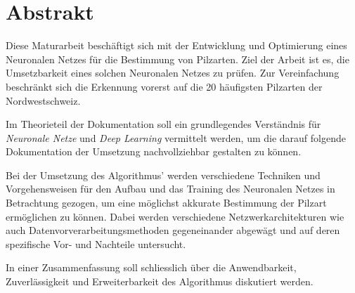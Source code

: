 \section*{Abstrakt}
Diese Maturarbeit beschäftigt sich mit der Entwicklung und Optimierung eines Neuronalen Netzes für die Bestimmung von Pilzarten. Ziel der Arbeit ist es, die Umsetzbarkeit eines solchen Neuronalen Netzes zu prüfen. Zur Vereinfachung beschränkt sich die Erkennung vorerst auf die 20 häufigsten Pilzarten der Nordwestschweiz.

Im Theorieteil der Dokumentation soll ein grundlegendes Verständnis für \textit{Neuronale Netze} und \textit{Deep Learning} vermittelt werden, um die darauf folgende Dokumentation der Umsetzung nachvollziehbar gestalten zu können.

Bei der Umsetzung des Algorithmus' werden verschiedene Techniken und Vorgehensweisen für den Aufbau und das Training des Neuronalen Netzes in Betrachtung gezogen, um eine möglichst akkurate Bestimmung der Pilzart ermöglichen zu können. Dabei werden verschiedene Netzwerkarchitekturen wie auch Datenvorverarbeitungsmethoden gegeneinander abgewägt und auf deren spezifische Vor- und Nachteile untersucht.

In einer Zusammenfassung soll schliesslich über die Anwendbarkeit, Zuverlässigkeit und Erweiterbarkeit des Algorithmus diskutiert werden. 